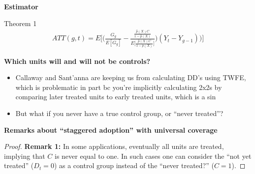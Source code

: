 \documentclass[notes=show]{beamer}
\begin{document}
\begin{frame}[plain]
\begin{center}
\textbf{Estimator}
\end{center}

Theorem 1
\begin{eqnarray*}
ATT(g,t) = E \bigg [ \bigg ( \frac{G_g}{E[G_g]} - \frac{ \frac{\hat{p}(X)C}{1-\hat{p}(X)}}{E \bigg [ \frac{\hat{p}(X)C}{1-\hat{p}(X)} \bigg ]} \bigg ) (Y_t - Y_{g-1} ) \bigg ) \bigg ]
\end{eqnarray*}

\end{frame}


\begin{frame}[plain]
\begin{center}
\textbf{Which units will and will not be controls?}
\end{center}

\begin{itemize}
\item Callaway and Sant'anna are keeping us from calculating DD's using TWFE, which is problematic in part bc you're implicitly calculating 2x2s by comparing later treated units to early treated units, which is a sin
\item But what if you never have a true control group, or ``never treated''?  
\end{itemize}

\end{frame}


\begin{frame}[plain]
\begin{center}
\textbf{Remarks about ``staggered adoption'' with universal coverage}
\end{center}


\begin{proof}{\textbf{Remark 1:}}
In some applications, eventually all units are treated, implying that $C$ is never equal to one. In such cases one can consider the ``not yet treated'' ($D_t = 0$) as a control group instead of
the ``never treated?'' ($C = 1$).
\end{proof}

\end{frame}
\end{document}
